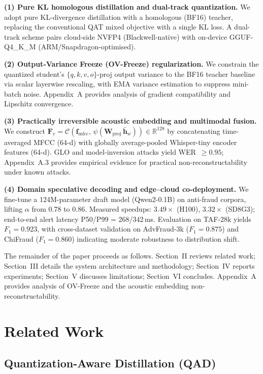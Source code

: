\documentclass[final,5p,times,number]{elsarticle}
\begin{document}
\textbf{(1) Pure KL homologous distillation and dual-track quantization.} We adopt pure KL-divergence distillation with a homologous (BF16) teacher, replacing the conventional QAT mixed objective with a single KL loss. A dual-track scheme pairs cloud-side NVFP4 (Blackwell-native) with on-device GGUF-Q4\_K\_M (ARM/Snapdragon-optimised).

\textbf{(2) Output-Variance Freeze (OV-Freeze) regularization.} We constrain the quantized student's $\{q,k,v,o\}$-proj output variance to the BF16 teacher baseline via scalar layerwise rescaling, with EMA variance estimation to suppress mini-batch noise. Appendix~A provides analysis of gradient compatibility and Lipschitz convergence.

\textbf{(3) Practically irreversible acoustic embedding and multimodal fusion.} We construct $\bm{F}_v = \mathcal{C}\!\left(\bm{f}_{\mathrm{mfcc}},\,\psi(\bm{W}_{\mathrm{proj}}\,\bar{\bm{h}}_w)\right) \in \mathbb{R}^{128}$ by concatenating time-averaged MFCC (64-d) with globally average-pooled Whisper-tiny encoder features (64-d). GLO and model-inversion attacks yield WER~$\ge 0.95$; Appendix~A.3 provides empirical evidence for practical non-reconstructability under known attacks.

\textbf{(4) Domain speculative decoding and edge--cloud co-deployment.} We fine-tune a 124M-parameter draft model (Qwen2-0.1B) on anti-fraud corpora, lifting $\alpha$ from 0.78 to 0.86. Measured speedups: $3.49\times$ (H100), $3.32\times$ (SD8G3); end-to-end alert latency P50/P99 = 268/342\,ms. Evaluation on TAF-28k yields $F_1 = 0.923$, with cross-dataset validation on AdvFraud-3k ($F_1 = 0.875$) and ChiFraud ($F_1 = 0.860$) indicating moderate robustness to distribution shift.

The remainder of the paper proceeds as follows. Section~II reviews related work; Section~III details the system architecture and methodology; Section~IV reports experiments; Section~V discusses limitations; Section~VI concludes. Appendix~A provides analysis of OV-Freeze and the acoustic embedding non-reconstructability.

\section{Related Work}
\subsection{Quantization-Aware Distillation (QAD)}
\end{document}
